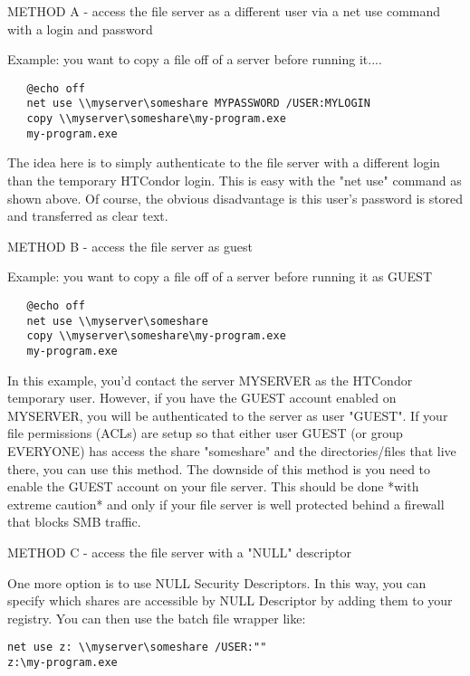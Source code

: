 METHOD A - access the file server as a different user via a net use command 
with a login and password

Example: you want to copy a file off of a server before running it....

\footnotesize
\begin{verbatim}
   @echo off
   net use \\myserver\someshare MYPASSWORD /USER:MYLOGIN
   copy \\myserver\someshare\my-program.exe
   my-program.exe
\end{verbatim}
\normalsize

The idea here is to simply authenticate to the file server with a different 
login than the temporary HTCondor login.  This is easy with the "net use" 
command as shown above.  Of course, the obvious disadvantage is this user's 
password is stored and transferred as clear text.

METHOD B - access the file server as guest

Example: you want to copy a file off of a server before running it as GUEST

\begin{verbatim}
   @echo off
   net use \\myserver\someshare
   copy \\myserver\someshare\my-program.exe
   my-program.exe
\end{verbatim}

In this example, you'd contact the server MYSERVER as the HTCondor temporary 
user.  However, if you have the GUEST account enabled on MYSERVER, you will 
be authenticated to the server as user "GUEST".  If your file permissions 
(ACLs) are setup so that either user GUEST (or group EVERYONE) has access 
the share "someshare" and the directories/files that live there, you can 
use this method.  The downside of this method is you need to enable the 
GUEST account on your file server.   \Warn This should be done *with 
extreme caution* and only if your file server is well protected behind a 
firewall that blocks SMB traffic.

METHOD C - access the file server with a "NULL" descriptor

One more option is to use NULL Security Descriptors.  In this way, you
can specify which shares are accessible by NULL Descriptor by adding
them to your registry.  You can then use the batch file wrapper like:

\begin{verbatim}
net use z: \\myserver\someshare /USER:""
z:\my-program.exe
\end{verbatim}

